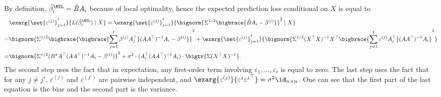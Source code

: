 	By definition, $\hat{\beta}_i^{\MTL} = \hat{B} A_i$ because of local optimality, hence the expected prediction loss conditional on $X$ is equal to
	\begin{align}
		 & \exarg{\set{\varepsilon^{(j)}}_{j=1}^t}{L(\hat{\beta}_i^{\MTL}) \mid X}
		= \exarg{\set{\varepsilon^{(j)}}_{j=1}^t}{\bignorm{\Sigma^{1/2} \bigbrace{\hat{B} A_i - \beta^{(i)}}}^2 \mid X} \nonumber \\
		 =& \bignorm{\Sigma^{1/2}\bigbrace{\bigbrace{\sum_{j=1}^t \beta^{(j)} A_j^{\top}} (AA^{\top})^{-1} A_i - \beta^{(i)}}}^2 \nonumber
		   + \exarg{\set{\varepsilon^{(j)}}_{j=1}^t}{\bignorm{\Sigma^{1/2} (X^{\top}X)^{-1} X^{\top} \bigbrace{\sum_{j=1}^t \varepsilon^{(j)} A_j^{\top}} (AA^{\top})^{-1} A_i}^2} \nonumber \\
		=& \bignorm{\Sigma^{1/2}(B^{\star} A^{\top} (A A^{\top})^{-1} A_i - \beta^{(i)})}^2
		+ \sigma^2 \cdot (A_i^{\top} (A A^{\top})^{-1} A_i) \cdot \bigtr{\Sigma (X^{\top}X)^{-1}}. \label{eq_ex_pred}
	\end{align}
	The second step uses the fact that in expectation, any first-order term involving $\varepsilon_1,\dots, \varepsilon_t$ is equal to zero.
	The last step uses the fact that for any $j\neq j'$, $\varepsilon^{(j)}$ and $\varepsilon^{(j')}$ are pairwise independent, and $\exarg{\varepsilon^{(j)}}{\varepsilon^{j}{\varepsilon^{j}}^{\top}} = \sigma^2 \id_{n\times n}$.
	One can see that the first part of the last equation is the bias and the second part is the variance.



